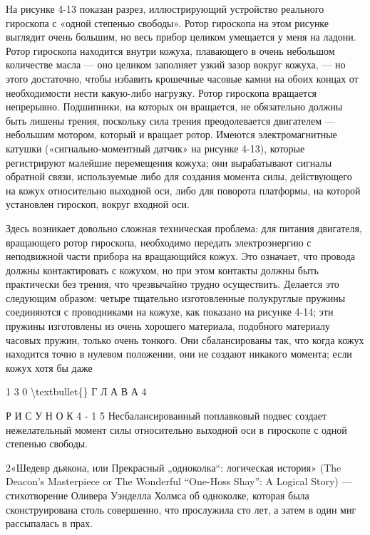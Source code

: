 \documentclass[10pt,oneside]{article}
\begin{document}
На рисунке 4-13 показан разрез, иллюстрирующий устройство реального гироскопа с «одной степенью свободы». Ротор гироскопа на этом рисунке выглядит очень большим, но весь прибор целиком умещается у меня на ладони. Ротор гироскопа находится внутри кожуха, плавающего в очень небольшом количестве масла --- оно целиком заполняет узкий зазор вокруг кожуха, --- но этого достаточно, чтобы избавить крошечные часовые камни на обоих концах от необходимости нести какую-либо нагрузку. Ротор гироскопа вращается непрерывно. Подшипники, на которых он вращается, не обязательно должны быть лишены трения, поскольку сила трения преодолевается двигателем --- небольшим мотором, который и вращает ротор. Имеются электромагнитные катушки («сигнально-моментный датчик» на рисунке 4-13), которые регистрируют малейшие перемещения кожуха; они вырабатывают сигналы обратной связи, используемые либо для создания момента силы, действующего на кожух относительно выходной оси, либо для поворота платформы, на которой установлен гироскоп, вокруг входной оси.\par

Здесь возникает довольно сложная техническая проблема: для питания двигателя, вращающего ротор гироскопа, необходимо передать электроэнергию с неподвижной части прибора на вращающийся кожух. Это означает, что провода должны контактировать с кожухом, но при этом контакты должны быть практически без трения, что чрезвычайно трудно осуществить. Делается это следующим образом: четыре тщательно изготовленные полукруглые пружины соединяются с проводниками на кожухе, как показано на рисунке 4-14; эти пружины изготовлены из очень хорошего материала, подобного материалу часовых пружин, только очень тонкого. Они сбалансированы так, что когда кожух находится точно в нулевом положении, они не создают никакого момента; если кожух хотя бы даже\par

1 3 0 \textbackslash{}textbullet\{\} Г Л А В А  4\par

Р И С У Н О К  4 - 1 5 Несбалансированный поплавковый подвес создает нежелательный момент силы относительно выходной оси в гироскопе с одной степенью свободы.\par

2«Шедевр дьякона, или Прекрасный „одноколка“: логическая история» (The Deacon’s Masterpiece or The Wonderful “One-Hoss Shay”: A Logical Story) --- стихотворение Оливера Уэнделла Холмса об одноколке, которая была сконструирована столь совершенно, что прослужила сто лет, а затем в один миг рассыпалась в прах.\par
\end{document}
